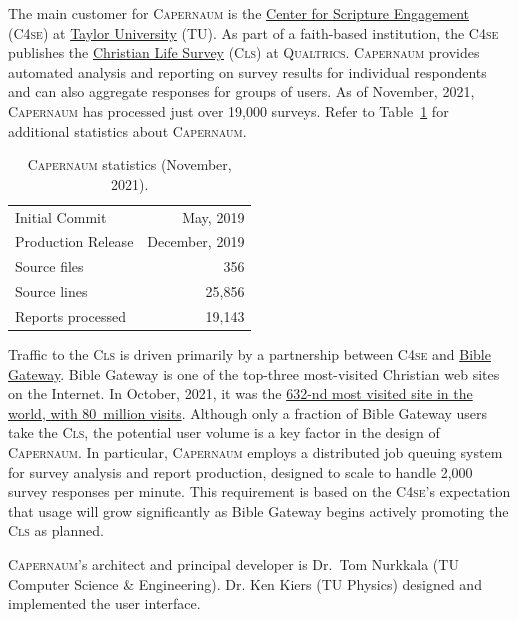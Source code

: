 \documentclass{article}
\newcommand{\caper}{\textsc{Capernaum}}
\newcommand{\cfse}{\textsc{C4se}}
\newcommand{\cls}{\textsc{Cls}}
\newcommand{\tu}{TU}
\newcommand{\qual}{\textsc{Qualtrics}}
\begin{document}
The main customer for \caper{}
is the
\href{https://www.taylor.edu/center-for-scripture-engagement/}{Center for Scripture Engagement}
(\cfse)
at \href{https://www.taylor.edu/}{Taylor University} (\tu).
As part of a faith-based institution,
the \cfse{} publishes the
\href{https://www.taylor.edu/center-for-scripture-engagement/survey/}{Christian Life Survey}
(\cls)
at \qual.
\caper{} provides automated analysis and reporting on survey results
for individual respondents and
can also aggregate responses for groups of users.
As of November, 2021,
\caper{} has processed just over 19,000 surveys.
Refer to Table~\ref{tab:caper-stats} for additional statistics about \caper.

\begin{table}
  \centering
  \begin{tabular}{lr}
    \toprule
    Initial Commit     & May, 2019      \\
    Production Release & December, 2019 \\
    \midrule
    Source files       & 356            \\
    Source lines       & 25,856         \\
    \midrule
    Reports processed  & 19,143         \\
    \bottomrule
  \end{tabular}
  \caption{\caper{} statistics (November, 2021).}
  \label{tab:caper-stats}
\end{table}

Traffic to the \cls{} is driven primarily by a partnership between \cfse{} and
\href{https://www.biblegateway.com/}{Bible Gateway}.
Bible Gateway is one of the top-three most-visited Christian web sites on the Internet.
In October, 2021, it was the
\href{https://www.similarweb.com/website/biblegateway.com/}{632-nd most visited site in the world,
  with 80~million visits}.
Although only a fraction of Bible Gateway users take the \cls,
the potential user volume is a key factor in the design of \caper.
In particular, \caper{} employs a distributed job queuing system
for survey analysis and report production,
designed to scale to handle 2,000 survey responses per minute.
This requirement is based on the \cfse{}'s
expectation that usage will grow significantly as Bible Gateway
begins actively promoting the \cls{} as planned.

\caper's architect and principal developer
is Dr.\ Tom Nurkkala (\tu{} Computer Science \& Engineering).
Dr. Ken Kiers (\tu{} Physics)
designed and implemented the user interface.
\end{document}
